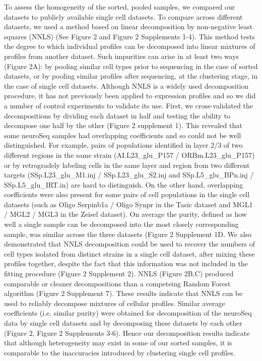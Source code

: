 To assess the homogeneity of the sorted, pooled samples, we compared our datasets to publicly available single cell datasets. To compare across different datasets, we used a method based on linear decomposition by non-negative least squares (NNLS) (See Figure 2 and Figure 2 Supplements 1-4). This method tests the degree to which individual profiles can be decomposed into linear mixtures of profiles from another dataset. Such impurities can arise in at least two ways (Figure 2A): by pooling similar cell types prior to sequencing in the case of sorted datasets, or by pooling similar profiles after sequencing, at the clustering stage, in the case of single cell datasets. Although NNLS is a widely used decomposition procedure, it has not previously been applied to expression profiles and so we did a number of control experiments to validate its use. First, we cross-validated the decompositions by dividing each dataset in half and testing the ability to decompose one half by the other (Figure 2 supplement 1). This revealed that some neuroSeq samples had overlapping coefficients and so could not be well distinguished. For example, pairs of populations identified in layer 2/3 of two different regions in the same strain (AI.L23_glu_P157 / ORBm.L23_glu_P157) or by retrogradely labeling cells in the same layer and region from two different targets (SSp.L23_glu_M1.inj / SSp.L23_glu_S2.inj and SSp.L5_glu_BPn.inj / SSp.L5_glu_IRT.in) are hard to distinguish. On the other hand, overlapping coefficients were also present for some pairs of cell populations in the single cell datasets (such as Oligo Serpinb1a / Oligo Synpr in the Tasic dataset and MGL1 / MGL2 / MGL3 in the Zeisel dataset). On average the purity, defined as how well a single sample can be decomposed into the most closely corresponding sample, was similar across the three datasets (Figure 2 Supplement 1D. We also demonstrated that NNLS decomposition could be used to recover the numbers of cell types isolated from distinct strains in a single cell dataset, after mixing these profiles together, despite the fact that this information was not included in the fitting procedure (Figure 2 Supplement 2). NNLS (Figure 2B,C) produced comparable or cleaner decompositions than a competeing Random Forest algorithm (Figure 2 Supplement 7). These results indicate that NNLS can be used to reliably decompose mixtures of cellular profiles. Similar average coefficients (i.e. similar purity) were obtained for decomposition of the neuroSeq data by single cell datasets and by decomposing these datasets by each other (Figure 2, Figure 2 Supplements 3-6). Hence our decomposition results indicate that although heterogeneity may exist in some of our sorted samples, it is comparable to the inaccuracies introduced by clustering single cell profiles.

